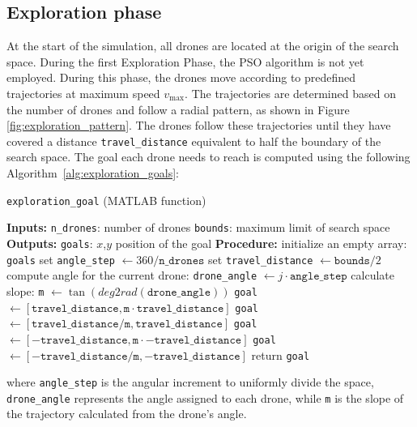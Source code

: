 \subsection{Exploration phase}
At the start of the simulation, all drones are located at the origin of the search space. 
During the first Exploration Phase, the PSO algorithm is not yet employed. 
During this phase, the drones move according to predefined trajectories at maximum speed $v_{\text{max}}$. 
The trajectories are determined based on the number of drones and follow a radial pattern, as shown in Figure \ref{fig:exploration_pattern}. 
The drones follow these trajectories until they have covered a distance \texttt{travel\_distance} equivalent to half the boundary of the search space.
The goal each drone needs to reach is computed using the following Algorithm~\ref{alg:exploration_goals}:
\begin{algorithm}[H]
    \caption{\texttt{exploration\_goal} (MATLAB function)} \label{alg:exploration_goals}
    \begin{algorithmic}[1]
        \State \textbf{Inputs:}
        \State \texttt{n\_drones}: number of drones
        \State \texttt{bounds}: maximum limit of search space
        \State \textbf{Outputs:}
        \State \texttt{goals}: $x$,$y$ position of the goal
        \State
        \State \textbf{Procedure:}
        \State initialize an empty array: \texttt{goals}
        \State set \texttt{angle\_step} $\gets 360 / \texttt{n\_drones}$
        \State set \texttt{travel\_distance} $\gets \texttt{bounds} / 2$
            \State compute angle for the current drone: \texttt{drone\_angle} $\gets j \cdot \texttt{angle\_step}$
            \State calculate slope: \texttt{m} $\gets \tan(\textit{deg2rad}(\texttt{drone\_angle}))$
                \State \texttt{goal} $\gets [\texttt{travel\_distance}, \texttt{m} \cdot \texttt{travel\_distance}]$ 
                \State \texttt{goal} $\gets [\texttt{travel\_distance} / \texttt{m}, \texttt{travel\_distance}]$ 
                \State \texttt{goal} $\gets [-\texttt{travel\_distance}, \texttt{m} \cdot -\texttt{travel\_distance}]$ 
                \State \texttt{goal} $\gets [-\texttt{travel\_distance} / \texttt{m}, -\texttt{travel\_distance}]$ 
            \EndIf
        \EndFor
        \State return \texttt{goal}
    \end{algorithmic}
\end{algorithm}
\noindent
where \texttt{angle\_step} is the angular increment to uniformly divide the space,
\texttt{drone\_angle} represents the angle assigned to each drone, 
while \texttt{m} is the slope of the trajectory calculated from the drone's angle. 

